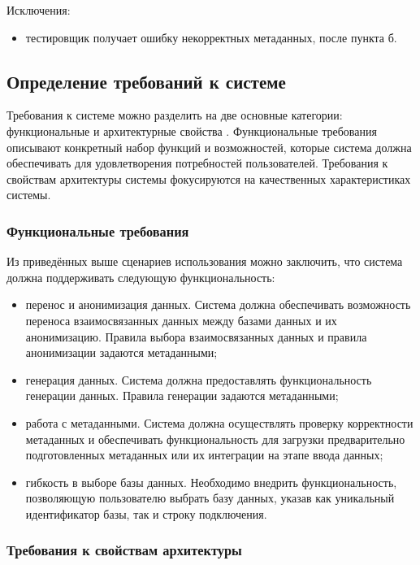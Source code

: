 Исключения:

\begin{itemize}
    \item тестировщик получает ошибку некорректных метаданных, после пункта б.
\end{itemize}


\subsection{Определение требований к системе}

Требования к системе можно разделить на две основные категории: функциональные и архитектурные свойства \cite{arch-requirements}. Функциональные требования описывают конкретный набор функций и возможностей, которые система должна обеспечивать для удовлетворения потребностей пользователей. Требования к свойствам архитектуры системы фокусируются на качественных характеристиках системы.

\subsubsection{Функциональные требования}

Из приведённых выше сценариев использования можно заключить, что система должна поддерживать следующую функциональность:

\begin{itemize}
    \item перенос и анонимизация данных. Система должна обеспечивать возможность переноса взаимосвязанных данных между базами данных и их анонимизацию. Правила выбора взаимосвязанных данных и правила анонимизации задаются метаданными;
    \item генерация данных. Система должна предоставлять функциональность генерации данных. Правила генерации задаются метаданными;
    \item работа с метаданными. Система должна осуществлять проверку корректности метаданных и обеспечивать функциональность для загрузки предварительно подготовленных метаданных или их интеграции на этапе ввода данных;
    \item гибкость в выборе базы данных. Необходимо внедрить функциональность, позволяющую пользователю выбрать базу данных, указав как уникальный идентификатор базы, так и строку подключения.
\end{itemize}

\subsubsection{Требования к свойствам архитектуры}

